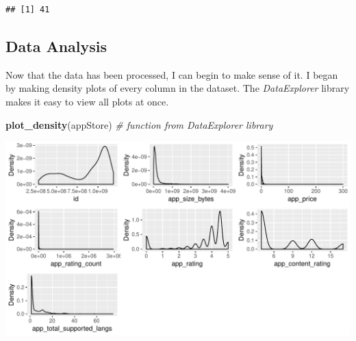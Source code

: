 \documentclass[]{article}
\newenvironment{Shaded}{\begin{snugshade}}{\end{snugshade}}
\newcommand{\KeywordTok}[1]{\textcolor[rgb]{0.13,0.29,0.53}{\textbf{#1}}}
\newcommand{\DecValTok}[1]{\textcolor[rgb]{0.00,0.00,0.81}{#1}}
\newcommand{\StringTok}[1]{\textcolor[rgb]{0.31,0.60,0.02}{#1}}
\newcommand{\CommentTok}[1]{\textcolor[rgb]{0.56,0.35,0.01}{\textit{#1}}}
\newcommand{\OtherTok}[1]{\textcolor[rgb]{0.56,0.35,0.01}{#1}}
\newcommand{\OperatorTok}[1]{\textcolor[rgb]{0.81,0.36,0.00}{\textbf{#1}}}
\newcommand{\NormalTok}[1]{#1}
\begin{document}
\begin{Shaded}
\end{Shaded}

\begin{verbatim}
## [1] 41
\end{verbatim}

\begin{Shaded}
\end{Shaded}

\subsection{Data Analysis}\label{data-analysis}

Now that the data has been processed, I can begin to make sense of it. I
began by making density plots of every column in the dataset. The
\emph{DataExplorer} library makes it easy to view all plots at once.

\begin{Shaded}
\begin{Highlighting}[]
\KeywordTok{plot_density}\NormalTok{(appStore) }\CommentTok{# function from DataExplorer library}
\end{Highlighting}
\end{Shaded}

\begin{center}\includegraphics{Plots/analysis1-1} \end{center}
\end{document}
